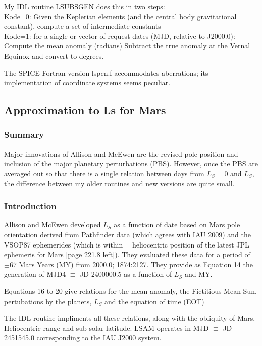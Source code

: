 \documentclass[draft]{article}
\begin{document}
My IDL routine LSUBSGEN does this in two steps:
\\ Kode=0: Given the Keplerian elements (and the central body gravitational
constant), compute a set of intermediate constants
\\ Kode=1: for a single or vector of request dates (MJD, relative to J2000.0):
\qi Compute the mean anomaly (radians)
\qi Subtract the true anomaly at the Vernal Equinox and convert to degrees.

The SPICE Fortran version lspcn.f accommodates aberrations; its implementation of
coordinate systems seems peculiar.


\subsection{Approximation to Ls for Mars}
\subsubsection{Summary} 
Major innovations of Allison and McEwen are the revised pole position and
inclusion of the major planetary perturbations (PBS). However, once the PBS are
averaged out so that there is a single relation between days from $L_S=0$ and
$L_S$, the difference between my older routines and new versions are quite small.

\subsubsection{Introduction} %
 Allison and McEwen \cite{Allison00} developed $L_S$ as a function of date based
 on Mars pole orientation derived from Pathfinder data (which agrees with IAU
 2009) and the VSOP87 ephemerides (which is within  \ \qd ~heliocentric
 position of the latest JPL ephemeris for Mars [page 221.8 left]).  They
 evaluated these data for a period of $\pm 67$ Mars Years (MY) from 2000.0;
 1874:2127.  They provide as Equation 14 the generation of MJD4 $\equiv$
 JD-2400000.5 as a function of $L_S$ and MY.

Equations 16 to 20 give relations for the mean anomaly, the Fictitious Mean Sun,
pertubations by the planets, $L_S$ and the equation of time (EOT)

The IDL routine  impliments all these relations, along with the
obliquity of Mars, Heliocentric range and sub-solar latitude. LSAM operates in
MJD $\equiv$ JD-2451545.0 corresponding to the IAU J2000 system.
\end{document}
